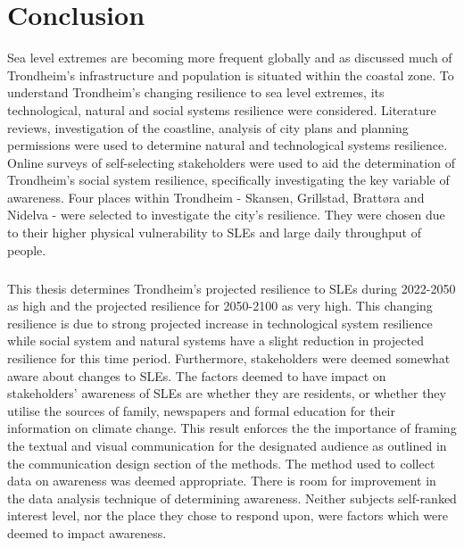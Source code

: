 

\chapter{Conclusion}

Sea level extremes are becoming more frequent globally and as discussed much of Trondheim's infrastructure and population is situated within the coastal zone. To understand Trondheim's changing resilience to sea level extremes, its technological, natural and social systems resilience were considered. Literature reviews, investigation of the coastline, analysis of city plans and planning permissions were used to determine natural and technological systems resilience. Online surveys of self-selecting stakeholders were used to aid the determination of Trondheim's social system resilience, specifically investigating the key variable of awareness. Four places within Trondheim - Skansen, Grillstad, Brattøra and Nidelva - were selected to investigate the city's resilience. They were chosen due to their higher physical vulnerability to SLEs and large daily throughput of people.
\paragraph{}
This thesis determines Trondheim's projected resilience to SLEs during 2022-2050 as high and the projected resilience for 2050-2100 as very high. This changing resilience is due to strong projected increase in technological system resilience while social system and natural systems have a slight reduction in projected resilience for this time period. Furthermore, stakeholders were deemed somewhat aware about changes to SLEs. The factors deemed to have impact on stakeholders' awareness of SLEs are whether they are residents, or whether they utilise the sources of family, newspapers and formal education for their information on climate change. This result enforces the the importance of framing the textual and visual communication for the designated audience as outlined in the communication design section of the methods.  The method used to collect data on awareness was deemed appropriate. There is room for improvement in the data analysis technique of determining awareness. Neither subjects self-ranked interest level, nor the place they chose to respond upon, were factors which were deemed to impact awareness.
